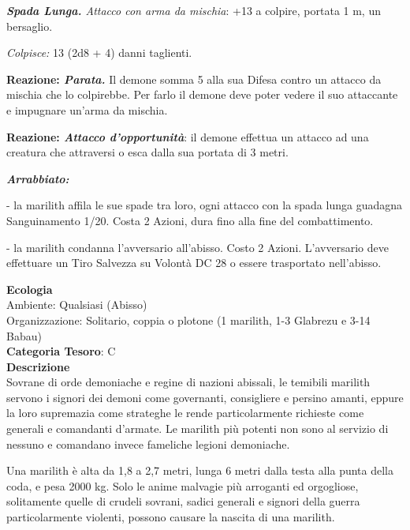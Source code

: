 \begin{multicols}{2}
{\emph{\textbf{Spada Lunga.} Attacco con arma da mischia}: +13 a colpire, portata 1 m, un bersaglio.

\emph{Colpisce:} 13 (2d8 + 4) danni taglienti.

\textbf{Reazione: \emph{Parata.}} Il demone somma 5 alla sua Difesa contro un attacco da mischia che lo colpirebbe. Per farlo il demone deve poter vedere il suo attaccante e impugnare un'arma da mischia.

\textbf{Reazione: \emph{Attacco d'opportunità}}: il demone effettua un attacco ad una creatura che attraversi o esca dalla sua portata di 3 metri.

\emph{\textbf{Arrabbiato:}}

- la marilith affila le sue spade tra loro, ogni attacco con la spada lunga guadagna Sanguinamento 1/20. Costa 2 Azioni, dura fino alla fine del combattimento.

- la marilith condanna l'avversario all'abisso. Costo 2 Azioni. L'avversario deve effettuare un Tiro Salvezza su Volontà DC 28 o essere trasportato nell'abisso.

\textbf{Ecologia}\\
Ambiente: Qualsiasi (Abisso)\\
Organizzazione: Solitario, coppia o plotone (1 marilith, 1-3 Glabrezu e 3-14 Babau)\\
\textbf{Categoria Tesoro}: C\\
\textbf{Descrizione}\\
Sovrane di orde demoniache e regine di nazioni abissali, le temibili marilith servono i signori dei demoni come governanti, consigliere e persino amanti, eppure la loro supremazia come strateghe le rende particolarmente richieste come generali e comandanti d'armate. Le marilith più potenti non sono al servizio di nessuno e comandano invece fameliche legioni demoniache.

Una marilith è alta da 1,8 a 2,7 metri, lunga 6 metri dalla testa alla punta della coda, e pesa 2000 kg. Solo le anime malvagie più arroganti ed orgogliose, solitamente quelle di crudeli sovrani, sadici generali e signori della guerra particolarmente violenti, possono causare la nascita di una marilith.

}
\end{multicols}
